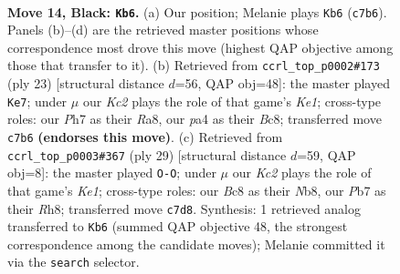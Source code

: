 \documentclass[11pt]{article}
\begin{document}
\clearpage

\begin{figure}[p]\centering
\begin{subfigure}{0.46\textwidth}\centering
\resizebox{\linewidth}{!}{%
\newchessgame
\chessboard[
  setfen={rnb1r3/1pk2ppp/4pn2/pNb5/P6P/1B2P3/1P1B1PP1/RN3RK1 b - - 6 14},
  showmover=false,
  pgfstyle=straightmove, color=movearrow, markmove={c7-b6}
]}
\caption{}
\end{subfigure}\hfill
\begin{subfigure}{0.46\textwidth}\centering
\resizebox{\linewidth}{!}{%
\newchessgame
\chessboard[
  setfen={r1b1k2r/pp3ppp/1n2p3/1Bb5/P7/2P2N2/1P2KPPP/R1B4R b kq - 2 12},
  showmover=false,
  pgfstyle=straightmove, color=movearrow, markmove={e8-e7}
]}
\caption{}
\end{subfigure}
\\[4pt]
\begin{subfigure}{0.46\textwidth}\centering
\resizebox{\linewidth}{!}{%
\newchessgame
\chessboard[
  setfen={rn2k2r/4bppp/p3pn2/1p6/3B4/P1N2PP1/1P3P1P/2R1KB1R b Kkq - 2 15},
  showmover=false,
  pgfstyle=straightmove, color=movearrow, markmove={e8-g8}
]}
\caption{}
\end{subfigure}\hfill

\caption{\textbf{Move 14, Black: \texttt{Kb6}.} (a) Our position; Melanie plays \texttt{Kb6} (\texttt{c7b6}). Panels (b)--(d) are the retrieved master positions whose correspondence most drove this move (highest QAP objective among those that transfer to it). (b) Retrieved from \texttt{ccrl\_top\_p0002\#173} (ply 23) [structural distance $d$=56, QAP obj=48]: the master played \texttt{Ke7}; under $\mu$ our \emph{Kc2} plays the role of that game's \emph{Ke1}; cross-type roles: our \emph{P}h7 as their \emph{R}a8, our \emph{p}a4 as their \emph{B}c8; transferred move \texttt{c7b6} \textbf{(endorses this move)}. (c) Retrieved from \texttt{ccrl\_top\_p0003\#367} (ply 29) [structural distance $d$=59, QAP obj=8]: the master played \texttt{O-O}; under $\mu$ our \emph{Kc2} plays the role of that game's \emph{Ke1}; cross-type roles: our \emph{B}c8 as their \emph{N}b8, our \emph{P}b7 as their \emph{R}h8; transferred move \texttt{c7d8}. Synthesis: 1 retrieved analog transferred to \texttt{Kb6} (summed QAP objective 48, the strongest correspondence among the candidate moves); Melanie committed it via the \texttt{search} selector.}
\label{fig:thought-m27}
\end{figure}

\clearpage
\end{document}
